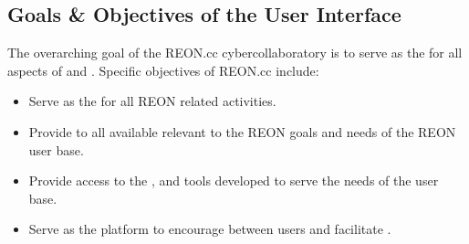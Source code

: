 \documentclass[letterpaper,12pt,english]{book}
\begin{document}
\subsection{Goals \& Objectives of the User Interface}
\label{\detokenize{requirements/goals/index:goals-objectives-of-the-user-interface}}\label{\detokenize{requirements/goals/index::doc}}
\sphinxAtStartPar
The overarching goal of the REON.cc cyber\sphinxhyphen{}collaboratory is to serve as the  for all aspects of  and . Specific objectives of REON.cc include:
\begin{itemize}
\item {} 
\sphinxAtStartPar
Serve as the  for all REON related activities.

\item {} 
\sphinxAtStartPar
Provide  to all available  relevant to the REON goals and needs of the REON user base.

\item {} 
\sphinxAtStartPar
Provide access to the ,  and  tools developed to serve the needs of the user base.

\item {} 
\sphinxAtStartPar
Serve as the platform to encourage  between users and facilitate \sphinxhyphen{}.

\end{itemize}
\end{document}
